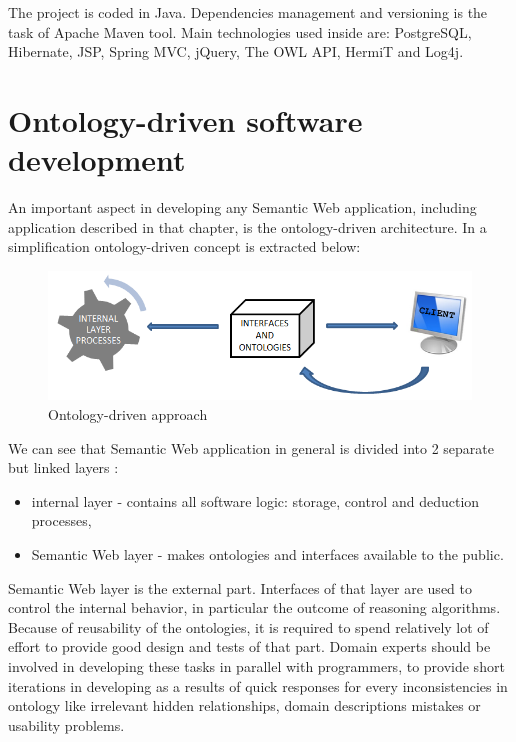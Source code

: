 The project is coded in Java. Dependencies management and versioning is the task of Apache Maven tool. Main technologies used inside are: PostgreSQL, Hibernate, JSP, Spring MVC, jQuery, The OWL API, HermiT and Log4j.

\section{Ontology-driven software development}
\label{sec:ontologyDrivenSoftwareDevelopment}

An important aspect in developing any Semantic Web application, including application described in that chapter, is the ontology-driven architecture. In a simplification ontology-driven concept is extracted below:

\medskip

\begin{figure}[htp]
\centering
\includegraphics[scale=0.5]{images/chapter4/OntologyDrivenConcept}
\caption{Ontology-driven approach}
\label{fig:ontologyDrivenConcept}
\end{figure}

\noindent We can see that Semantic Web application in general is divided into 2 separate but linked layers \cite{OntDrivDev}:
\begin{itemize}
    \setlength{\itemsep}{0cm}
    \setlength{\parskip}{0cm}

    \item internal layer - contains all software logic: storage, control and deduction processes,
    \item Semantic Web layer - makes ontologies and interfaces available to the public.
\end{itemize}

\noindent Semantic Web layer is the external part. Interfaces of that layer are used to control the internal behavior, in particular the outcome of reasoning algorithms. Because of reusability of the ontologies, it is required to spend relatively lot of effort to provide good design and tests of that part. Domain experts should be involved in developing these tasks in parallel with programmers, to provide short iterations in developing as a results of quick responses for every inconsistencies in ontology like irrelevant hidden relationships, domain descriptions mistakes or usability problems. 

